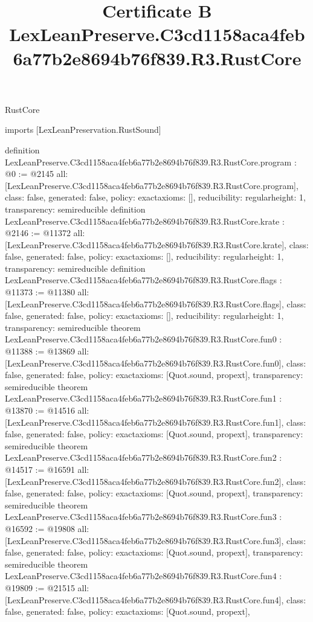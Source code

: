 \begin{lexlean}{RustCore}
\title{Certificate B LexLeanPreserve.C3cd1158aca4feb6a77b2e8694b76f839.R3.RustCore}
\begin{coremodule}
imports [LexLeanPreservation.RustSound]

definition LexLeanPreserve.C3cd1158aca4feb6a77b2e8694b76f839.R3.RustCore.program : @0 := @2145 {
  all: [LexLeanPreserve.C3cd1158aca4feb6a77b2e8694b76f839.R3.RustCore.program],
  class: false,
  generated: false,
  policy: exact{axioms: []},
  reducibility: regular{height: 1},
  transparency: semireducible
}
definition LexLeanPreserve.C3cd1158aca4feb6a77b2e8694b76f839.R3.RustCore.krate : @2146 := @11372 {
  all: [LexLeanPreserve.C3cd1158aca4feb6a77b2e8694b76f839.R3.RustCore.krate],
  class: false,
  generated: false,
  policy: exact{axioms: []},
  reducibility: regular{height: 1},
  transparency: semireducible
}
definition LexLeanPreserve.C3cd1158aca4feb6a77b2e8694b76f839.R3.RustCore.flags : @11373 := @11380 {
  all: [LexLeanPreserve.C3cd1158aca4feb6a77b2e8694b76f839.R3.RustCore.flags],
  class: false,
  generated: false,
  policy: exact{axioms: []},
  reducibility: regular{height: 1},
  transparency: semireducible
}
theorem LexLeanPreserve.C3cd1158aca4feb6a77b2e8694b76f839.R3.RustCore.fun0 : @11388 := @13869 {
  all: [LexLeanPreserve.C3cd1158aca4feb6a77b2e8694b76f839.R3.RustCore.fun0],
  class: false,
  generated: false,
  policy: exact{axioms: [Quot.sound, propext]},
  transparency: semireducible
}
theorem LexLeanPreserve.C3cd1158aca4feb6a77b2e8694b76f839.R3.RustCore.fun1 : @13870 := @14516 {
  all: [LexLeanPreserve.C3cd1158aca4feb6a77b2e8694b76f839.R3.RustCore.fun1],
  class: false,
  generated: false,
  policy: exact{axioms: [Quot.sound, propext]},
  transparency: semireducible
}
theorem LexLeanPreserve.C3cd1158aca4feb6a77b2e8694b76f839.R3.RustCore.fun2 : @14517 := @16591 {
  all: [LexLeanPreserve.C3cd1158aca4feb6a77b2e8694b76f839.R3.RustCore.fun2],
  class: false,
  generated: false,
  policy: exact{axioms: [Quot.sound, propext]},
  transparency: semireducible
}
theorem LexLeanPreserve.C3cd1158aca4feb6a77b2e8694b76f839.R3.RustCore.fun3 : @16592 := @19808 {
  all: [LexLeanPreserve.C3cd1158aca4feb6a77b2e8694b76f839.R3.RustCore.fun3],
  class: false,
  generated: false,
  policy: exact{axioms: [Quot.sound, propext]},
  transparency: semireducible
}
theorem LexLeanPreserve.C3cd1158aca4feb6a77b2e8694b76f839.R3.RustCore.fun4 : @19809 := @21515 {
  all: [LexLeanPreserve.C3cd1158aca4feb6a77b2e8694b76f839.R3.RustCore.fun4],
  class: false,
  generated: false,
  policy: exact{axioms: [Quot.sound, propext]},
}
\end{coremodule}
\end{lexlean}
